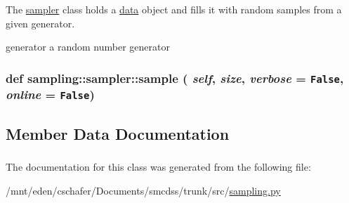 The \hyperlink{classsampling_1_1sampler}{sampler} class holds a \hyperlink{classsampling_1_1data}{data} object and fills it with random samples from a given generator. 

generator a random number generator \hypertarget{classsampling_1_1sampler_a3908666fdfd325eb00c171a267fe650}{
\subsubsection[{sample}]{\setlength{\rightskip}{0pt plus 5cm}def sampling::sampler::sample ( {\em self}, \/   {\em size}, \/   {\em verbose} = {\tt False}, \/   {\em online} = {\tt False})}}
\label{classsampling_1_1sampler_a3908666fdfd325eb00c171a267fe650}




\subsection{Member Data Documentation}
\hypertarget{classsampling_1_1sampler_ac2f0763c7a907e0968b96b6e440ab5a}{
\subsubsection[{data}]{}}
\label{classsampling_1_1sampler_ac2f0763c7a907e0968b96b6e440ab5a}


\hypertarget{classsampling_1_1sampler_96f11b07709c74778ddd41e8d7ea1439}{
\subsubsection[{gen}]{}}
\label{classsampling_1_1sampler_96f11b07709c74778ddd41e8d7ea1439}


\hypertarget{classsampling_1_1sampler_5a11056b435de5e46629d6517120bb98}{
\subsubsection[{targetDistr}]{}}
\label{classsampling_1_1sampler_5a11056b435de5e46629d6517120bb98}




The documentation for this class was generated from the following file:\begin{CompactItemize}
\item 
/mnt/eden/cschafer/Documents/smcdss/trunk/src/\hyperlink{sampling_8py}{sampling.py}\end{CompactItemize}
